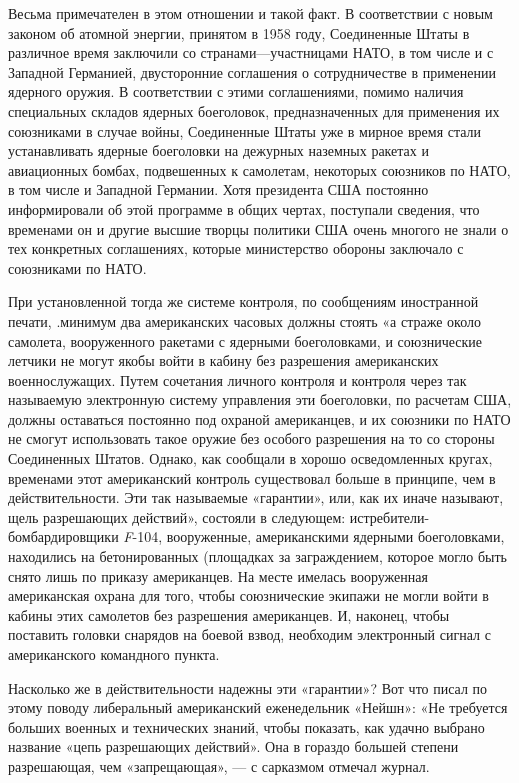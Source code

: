 \documentclass[12pt, a4paper, openany]{book}
\begin{document}
	Весьма примечателен в этом отношении и такой факт. В соответствии с новым законом об атомной энергии, принятом в 1958 году, Соединенные Штаты в различное время заключили со странами—участницами НАТО, в том числе и с Западной Германией, двусторонние соглашения о сотрудничестве в применении ядерного оружия. В соответствии с этими соглашениями, помимо наличия специальных складов ядерных боеголовок, предназначенных для применения их союзниками в случае войны, Соединенные Штаты уже в мирное время стали устанавливать ядерные боеголовки на дежурных наземных ракетах и авиационных бомбах, подвешенных к самолетам, некоторых союзников по НАТО, в том числе и Западной Германии. Хотя президента США постоянно информировали об этой программе в общих чертах, поступали сведения, что временами он и другие высшие творцы политики США очень многого не знали о тех конкретных соглашениях, которые министерство обороны заключало с союзниками по НАТО. 
	
	При установленной тогда же системе контроля, по сообщениям иностранной печати, .минимум два американских часовых должны стоять «а страже около самолета, вооруженного ракетами с ядерными боеголовками, и союзнические летчики не могут якобы войти в кабину без разрешения американских военнослужащих. Путем сочетания личного контроля и контроля через так называемую электронную систему управления эти боеголовки, по расчетам США, должны оставаться постоянно под охраной американцев, и их союзники по НАТО не смогут использовать такое оружие без особого разрешения на то со стороны Соединенных Штатов. Однако, как сообщали в хорошо осведомленных кругах, временами этот американский контроль существовал больше в принципе, чем в действительности. Эти так называемые «гарантии», или, как их иначе называют, щель разрешающих действий», состояли в следующем: истребители-бомбардировщики \textit{F}-104, вооруженные, американскими ядерными боеголовками, находились на бетонированных (площадках за заграждением, которое могло быть снято лишь по приказу американцев. На месте имелась вооруженная американская охрана для того, чтобы союзнические экипажи не могли войти в кабины этих самолетов без разрешения американцев. И, наконец, чтобы поставить головки снарядов на боевой взвод, необходим электронный сигнал с американского командного пункта.
	
	Насколько же в действительности надежны эти «гарантии»? Вот что писал по этому поводу либеральный американский еженедельник «Нейшн»: «Не требуется больших военных и технических знаний, чтобы показать, как удачно выбрано название «цепь разрешающих действий». Она в гораздо большей степени разрешающая, чем «запрещающая», — с сарказмом отмечал журнал.
	
\end{document}
